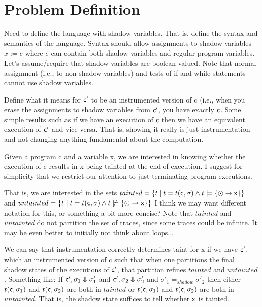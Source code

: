 \documentclass[]{article}
\begin{document}
{\section{Problem Definition}
Need to define the language with shadow variables. That is,
  define the syntax and semantics of the language. Syntax should allow
assignments to shadow variables $\overline{x} := e$ where $e$ can
contain both shadow variables and regular program variables. Let's
assume/require that shadow variables are boolean valued. Note that
normal assignment (i.e., to non-shadow variables) and tests of if and
while statements cannot use shadow variables.

Define what it means for ${\sf c}'$ to be an instrumented version of {\sf c} (i.e.,
when you erase the assignments to shadow variables from ${\sf c}'$,
you have exactly ${\sf c}$. Some simple results such as if we have an
execution of ${\sf c}$ then we have an equivalent execution of ${\sf
  c}'$ and vice versa. That is, showing it really is just
instrumentation and not changing anything fundamental about the computation.

Given a program {\sf c} and a variable {\sf x}, we are interested in
knowing whether the execution of {\sf c} results in {\sf x} being
tainted at the end of execution. I suggest for simplicity that
  we restrict our attention to just terminating program executions.

That is, we are interested in the sets $tainted = \{ t \mid t =
t({\sf c},\sigma) \land t \models \{ \odot \rightarrow {\sf x} \} \}$ and
$untainted = \{ t \mid
t = t({\sf c},\sigma) \land t \not\models \{ \odot \rightarrow {\sf x} \} \}$
I think we may want different notation for this, or something a bit more
concise?
Note that $tainted$ and $untainted$ do not partition the set of
traces, since some traces could be infinite. It may be even better to initially not think about loops...

We can say that instrumentation correctly determines taint for {\sf x}
if we have ${\sf c}'$, which an instrumented version of {\sf c} such
that when one partitions the final shadow states of the executions of
${\sf c}'$, that partition refines $tainted$ and
$untainted$. Something like:
If ${\sf c}', \sigma_1 \Downarrow \sigma'_1$ and ${\sf c}', \sigma_2
\Downarrow \sigma'_2$ and $\sigma'_1 =_\mathit{shadow} \sigma'_2$ then
either $t({\sf c},\sigma_1)$ and $t({\sf c},\sigma_2)$ are both in $tainted$ or 
$t({\sf c},\sigma_1)$ and $t({\sf c},\sigma_2)$ are both in $untainted$. That is, the shadow
state suffices to tell whether $\sf x$ is tainted.

}
\end{document}
